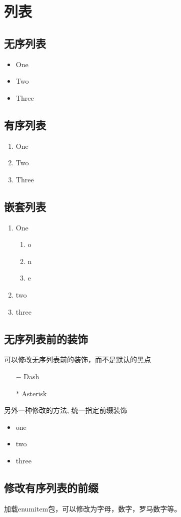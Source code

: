 \section{列表}
\subsection{无序列表}
\begin{itemize}
	\item One
	\item Two
	\item Three
\end{itemize}
\subsection{有序列表}
\begin{enumerate}
	\item One
	\item Two
	\item Three
\end{enumerate}
\subsection{嵌套列表}
\begin{enumerate}
	\item One
	\begin{enumerate}
		\item o
		\item n
		\item e
	\end{enumerate}
	\item two
	\item three
\end{enumerate}
\subsection{无序列表前的装饰}
可以修改无序列表前的装饰，而不是默认的黑点
\begin{itemize}
	\item[$-$] Dash
	\item[$\ast$] Asterisk
\end{itemize}
另外一种修改的方法, 统一指定前缀装饰
\begin{itemize}[label=$\ast$]
	\item one
	\item two
	\item three
\end{itemize}
\subsection{修改有序列表的前缀}
加载enumitem包，可以修改为字母，数字，罗马数字等。
